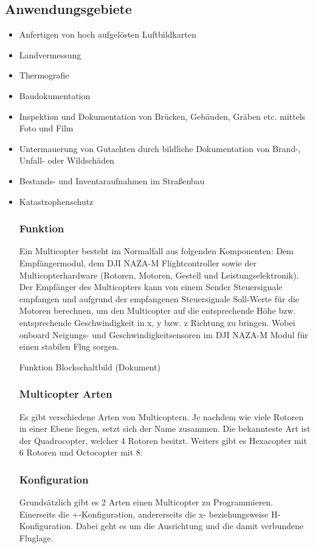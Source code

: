  \subsection{Anwendungsgebiete}
  \begin{itemize}
    \item Anfertigen von hoch aufgelösten Luftbildkarten
    \item Landvermessung
    \item Thermografie
    \item Baudokumentation
    \item Inspektion und Dokumentation von Brücken, Gebäuden, Gräben etc. mittels Foto und Film
    \item Untermauerung von Gutachten durch bildliche Dokumentation von Brand-, Unfall- oder Wildschäden
    \item Bestands- und Inventaraufnahmen im Straßenbau
    \item Katastrophenschutz

  \cite{copterAnwendung}


  \subsubsection{Funktion}
  Ein Multicopter besteht im Normalfall aus folgenden Komponenten:
  Dem Empfängermodul, dem DJI NAZA-M Flightcontroller sowie der Multicopterhardware (Rotoren, Motoren, Gestell und Leistungselektronik). Der Empfänger des Multicopters kann von einem Sender Steuersignale empfangen und aufgrund der empfangenen Steuersignale Soll-Werte für die Motoren berechnen, um den Multicopter auf die entsprechende Höhe bzw. entsprechende Geschwindigkeit in x, y bzw. z Richtung zu bringen. Wobei onboard Neigungs- und Geschwindigkeitsensoren im DJI NAZA-M Modul für einen stabilen Flug sorgen. 

  Funktion Blockschaltbild (Dokument)

  \subsubsection{Multicopter Arten}
  Es gibt verschiedene Arten von Multicoptern. 
  Je nachdem wie viele Rotoren in einer Ebene liegen, setzt sich der Name zusammen.
  Die bekannteste Art ist der Quadrocopter, welcher 4 Rotoren besitzt. Weiters gibt es Hexacopter mit 6 Rotoren und Octocopter mit 8.


  \subsubsection{Konfiguration}
  Grundsätzlich gibt es 2 Arten einen Multicopter zu Programmieren.
  Einerseits die +-Konfiguration, andererseits die x- beziehungsweise H-Konfiguration. Dabei geht es um die Ausrichtung und die damit verbundene Fluglage.


\end{itemize}
